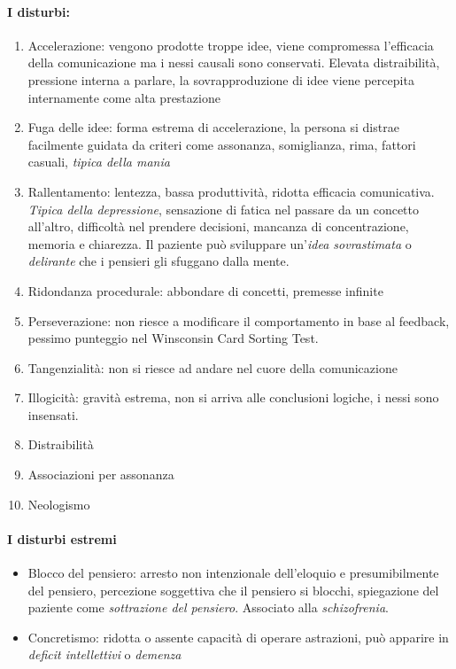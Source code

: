 {\paragraph{I disturbi:}  
\begin{enumerate}
	\item Accelerazione: vengono prodotte troppe idee, viene compromessa l'efficacia della comunicazione ma i nessi causali sono conservati. Elevata distraibilità, pressione interna a parlare, la sovrapproduzione di idee viene percepita internamente come alta prestazione
	\item Fuga delle idee: forma estrema di accelerazione, la persona si distrae facilmente guidata da criteri come assonanza, somiglianza, rima, fattori casuali, \emph{tipica della mania} 
	\item Rallentamento: lentezza, bassa produttività, ridotta efficacia comunicativa. \emph{Tipica della depressione}, sensazione di fatica nel passare da un concetto all'altro, difficoltà nel prendere decisioni, mancanza di concentrazione, memoria e chiarezza. Il paziente può sviluppare un'\emph{idea sovrastimata} o \emph{delirante} che i pensieri gli sfuggano dalla mente.
	\item Ridondanza procedurale: abbondare di concetti, premesse infinite
	\item Perseverazione: non riesce a modificare il comportamento in base al feedback, pessimo punteggio nel Winsconsin Card Sorting Test.
	\item Tangenzialità: non si riesce ad andare nel cuore della comunicazione
	\item Illogicità: gravità estrema, non si arriva alle conclusioni logiche, i nessi sono insensati.
	\item Distraibilità
	\item Associazioni per assonanza
	\item Neologismo
\end{enumerate}
\paragraph{I disturbi estremi}  
\begin{itemize}
	\item Blocco del pensiero: arresto non intenzionale dell'eloquio e presumibilmente del pensiero, percezione soggettiva che il pensiero si blocchi, spiegazione del paziente come \emph{sottrazione del pensiero}. Associato alla \emph{schizofrenia}. 
	\item Concretismo: ridotta o assente capacità di operare astrazioni, può apparire in \emph{deficit intellettivi} o \emph{demenza} 
\end{itemize}
}
